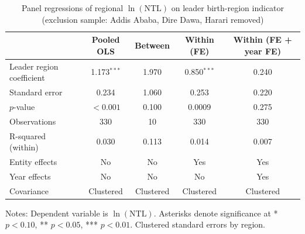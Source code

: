 \begin{table}[ht]
\centering
\caption{Panel regressions of regional $\ln(\mathrm{NTL})$ on leader birth-region indicator (exclusion sample: Addis Ababa, Dire Dawa, Harari removed)}
\begin{tabular}{lcccc}
\toprule
 & Pooled OLS & Between & Within (FE) & Within (FE + year FE) \\
\midrule
Leader region coefficient & 1.173$^{***}$ & 1.970 & 0.850$^{***}$ & 0.240 \\
Standard error & 0.234 & 1.060 & 0.253 & 0.220 \\
$p$-value & $<0.001$ & 0.100 & 0.0009 & 0.275 \\
Observations & 330 & 10 & 330 & 330 \\
R-squared (within) & 0.030 & 0.113 & 0.014 & 0.007 \\
Entity effects & No & No & Yes & Yes \\
Year effects & No & No & No & Yes \\
Covariance & Clustered & Clustered & Clustered & Clustered \\
\bottomrule
\end{tabular}
\vspace{4pt}
{\footnotesize Notes: Dependent variable is $\ln(\mathrm{NTL})$. Asterisks denote significance at * $p<0.10$, ** $p<0.05$, *** $p<0.01$. Clustered standard errors by region.}
\label{tab:panel_reg}
\end{table}

